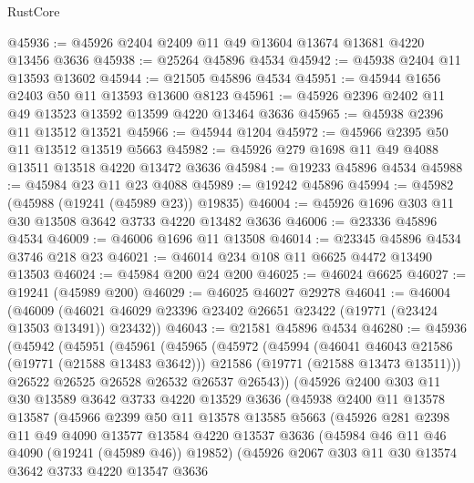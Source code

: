 \begin{lexlean}{RustCore}
\begin{coremodule}
@45936 := @45926 @2404 @2409 @11 @49 @13604 @13674 @13681 @4220 @13456 @3636
@45938 := @25264 @45896 @4534
@45942 := @45938 @2404 @11 @13593 @13602
@45944 := @21505 @45896 @4534
@45951 := @45944 @1656 @2403 @50 @11 @13593 @13600 @8123
@45961 := @45926 @2396 @2402 @11 @49 @13523 @13592 @13599 @4220 @13464 @3636
@45965 := @45938 @2396 @11 @13512 @13521
@45966 := @45944 @1204
@45972 := @45966 @2395 @50 @11 @13512 @13519 @5663
@45982 := @45926 @279 @1698 @11 @49 @4088 @13511 @13518 @4220 @13472 @3636
@45984 := @19233 @45896 @4534
@45988 := @45984 @23 @11 @23 @4088
@45989 := @19242 @45896
@45994 := @45982 (@45988 (@19241 (@45989 @23)) @19835)
@46004 := @45926 @1696 @303 @11 @30 @13508 @3642 @3733 @4220 @13482 @3636
@46006 := @23336 @45896 @4534
@46009 := @46006 @1696 @11 @13508
@46014 := @23345 @45896 @4534 @3746 @218 @23
@46021 := @46014 @234 @108 @11 @6625 @4472 @13490 @13503
@46024 := @45984 @200 @24 @200
@46025 := @46024 @6625
@46027 := @19241 (@45989 @200)
@46029 := @46025 @46027 @29278
@46041 := @46004
    (@46009 (@46021 @46029 @23396 @23402 @26651 @23422 (@19771 (@23424 @13503 @13491)) @23432))
@46043 := @21581 @45896 @4534
@46280 := @45936
    (@45942
      (@45951
        (@45961
          (@45965
            (@45972
              (@45994
                (@46041 @46043 @21586 (@19771 (@21588 @13483 @3642)))
                @21586
                (@19771 (@21588 @13473 @13511)))
              @26522
              @26525
              @26528
              @26532
              @26537
              @26543))
          (@45926
            @2400
            @303
            @11
            @30
            @13589
            @3642
            @3733
            @4220
            @13529
            @3636
            (@45938
              @2400
              @11
              @13578
              @13587
              (@45966
                @2399
                @50
                @11
                @13578
                @13585
                @5663
                (@45926
                  @281
                  @2398
                  @11
                  @49
                  @4090
                  @13577
                  @13584
                  @4220
                  @13537
                  @3636
                  (@45984 @46 @11 @46 @4090 (@19241 (@45989 @46)) @19852)
                  (@45926
                    @2067
                    @303
                    @11
                    @30
                    @13574
                    @3642
                    @3733
                    @4220
                    @13547
                    @3636

\end{coremodule}
\end{lexlean}
